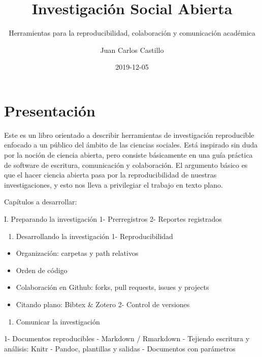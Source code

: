 \documentclass[11pt,]{book}
\title{Investigación Social Abierta}
\subtitle{Herramientas para la reproducibilidad, colaboración y comunicación académica}
\author{Juan Carlos Castillo}
\date{2019-12-05}
\providecommand{\tightlist}{%
  \setlength{\itemsep}{0pt}\setlength{\parskip}{0pt}}
\begin{document}
\maketitle

{
\setcounter{tocdepth}{1}
\tableofcontents
}
\hypertarget{presentaciuxf3n}{%
\chapter*{Presentación}\label{presentaciuxf3n}}

Este es un libro orientado a describir herramientas de investigación reproducible enfocado a un público del ámbito de las ciencias sociales. Está inspirado sin duda por la noción de ciencia abierta, pero consiste básicamente en una guía práctica de software de escritura, comunicación y colaboración. El argumento básico es que el hacer ciencia abierta pasa por la reproducibilidad de nuestras investigaciones, y esto nos lleva a privilegiar el trabajo en texto plano.

Capítulos a desarrollar:

I. Preparando la investigación
1- Prerregistros
2- Reportes registrados

\begin{enumerate}
\def\labelenumi{\Roman{enumi}.}
\setcounter{enumi}{1}
\tightlist
\item
  Desarrollando la investigación
  1- Reproducibilidad
\end{enumerate}

\begin{itemize}
\tightlist
\item
  Organización: carpetas y path relativos
\item
  Orden de código
\item
  Colaboración en Github: forks, pull requests, issues y projects
\item
  Citando plano: Bibtex \& Zotero
  2- Control de versiones
\end{itemize}

\begin{enumerate}
\def\labelenumi{\Roman{enumi}.}
\setcounter{enumi}{2}
\tightlist
\item
  Comunicar la investigación
\end{enumerate}

1- Documentos reproducibles
- Markdown / Rmarkdown
- Tejiendo escritura y análisis: Knitr
- Pandoc, plantillas y salidas
- Documentos con parámetros
\end{document}
